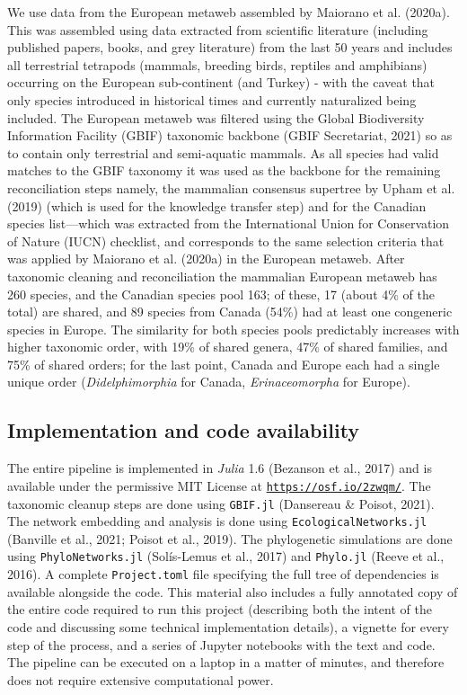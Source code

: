 \documentclass[10pt,oneside]{article}
\begin{document}
We use data from the European metaweb assembled by Maiorano et al.
(2020a). This was assembled using data extracted from scientific
literature (including published papers, books, and grey literature) from
the last 50 years and includes all terrestrial tetrapods (mammals,
breeding birds, reptiles and amphibians) occurring on the European
sub-continent (and Turkey) - with the caveat that only species
introduced in historical times and currently naturalized being included.
The European metaweb was filtered using the Global Biodiversity
Information Facility (GBIF) taxonomic backbone (GBIF Secretariat, 2021)
so as to contain only terrestrial and semi-aquatic mammals. As all
species had valid matches to the GBIF taxonomy it was used as the
backbone for the remaining reconciliation steps namely, the mammalian
consensus supertree by Upham et al. (2019) (which is used for the
knowledge transfer step) and for the Canadian species list---which was
extracted from the International Union for Conservation of Nature (IUCN)
checklist, and corresponds to the same selection criteria that was
applied by Maiorano et al. (2020a) in the European metaweb. After
taxonomic cleaning and reconciliation the mammalian European metaweb has
260 species, and the Canadian species pool 163; of these, 17 (about 4\%
of the total) are shared, and 89 species from Canada (54\%) had at least
one congeneric species in Europe. The similarity for both species pools
predictably increases with higher taxonomic order, with 19\% of shared
genera, 47\% of shared families, and 75\% of shared orders; for the last
point, Canada and Europe each had a single unique order
(\emph{Didelphimorphia} for Canada, \emph{Erinaceomorpha} for Europe).

\hypertarget{implementation-and-code-availability}{%
\subsection{Implementation and code
availability}\label{implementation-and-code-availability}}

The entire pipeline is implemented in \emph{Julia} 1.6 (Bezanson et al.,
2017) and is available under the permissive MIT License at
\href{https://osf.io/2zwqm/}{\texttt{https://osf.io/2zwqm/}}. The
taxonomic cleanup steps are done using \texttt{GBIF.jl} (Dansereau \&
Poisot, 2021). The network embedding and analysis is done using
\texttt{EcologicalNetworks.jl} (Banville et al., 2021; Poisot et al.,
2019). The phylogenetic simulations are done using
\texttt{PhyloNetworks.jl} (Solís-Lemus et al., 2017) and
\texttt{Phylo.jl} (Reeve et al., 2016). A complete \texttt{Project.toml}
file specifying the full tree of dependencies is available alongside the
code. This material also includes a fully annotated copy of the entire
code required to run this project (describing both the intent of the
code and discussing some technical implementation details), a vignette
for every step of the process, and a series of Jupyter notebooks with
the text and code. The pipeline can be executed on a laptop in a matter
of minutes, and therefore does not require extensive computational
power.
\end{document}
